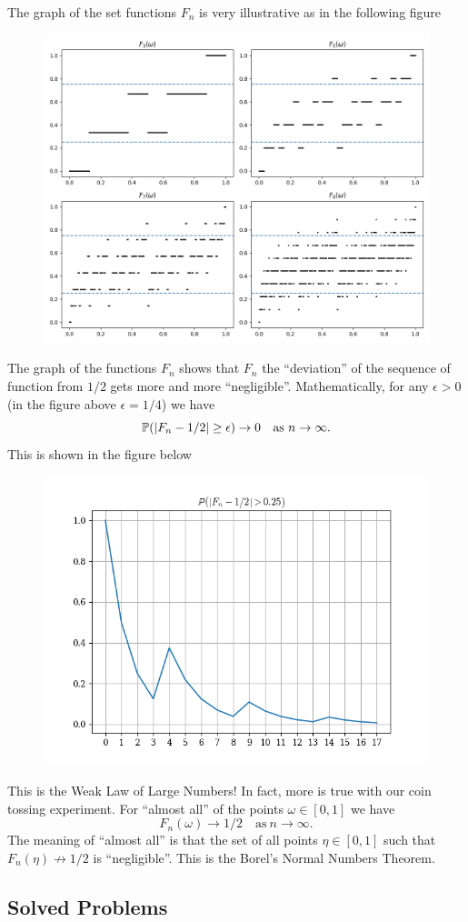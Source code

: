 The graph of the set functions $ F_n $ is very illustrative as in the following figure
\begin{figure}[h!]
	\centering
	\includegraphics[width=0.6\linewidth]{Images/FractionRandomVariable}
	\label{fig:fractionrandomvariable}
\end{figure}
\FloatBarrier
The graph of the functions $ F_n $ shows that $ F_n $ the ``deviation'' of the sequence of function from $ 1/2 $ gets more and more ``negligible''. Mathematically, for any $ \epsilon>0 $ (in the figure above $ \epsilon=1/4 $) we have
\[ \mathbb{P}(|F_n - 1/2|\geq \epsilon)\to 0 \quad \text{as } n\to\infty. \]
This is shown in the figure below
\begin{figure}[h!]
	\centering
	\includegraphics[width=0.5\linewidth]{Images/convergenceInProb}
	\label{fig:convergenceinprob}
\end{figure}
\FloatBarrier
This is the Weak Law of Large Numbers! In fact, more is true with our coin tossing experiment. For ``almost all'' of the points $ \omega \in [0,1] $ we have
\[ F_n(\omega) \to 1/2 \quad \text{as}\ n\to\infty. \]
The meaning of ``almost all'' is that the set of all points $ \eta \in [0,1] $ such that $ F_n(\eta)\not\to 1/2 $ is ``negligible''. This is the Borel's Normal Numbers Theorem.




\subsection{Solved Problems}

